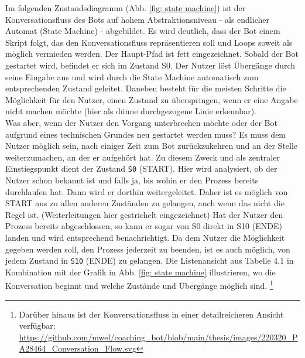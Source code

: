 	Im folgenden Zustandsdiagramm (Abb. \ref*{fig: state machine}) ist der Konversationsfluss des Bots auf hohem Abstraktionsniveau - als endlicher Automat (State Machine) - abgebildet. Es wird deutlich, dass der Bot einem Skript folgt, das den Konversationsfluss repräsentieren soll und Loops soweit als möglich vermieden werden. Der Haupt-Pfad ist fett eingezeichnet. Sobald der Bot gestartet wird, befindet er sich im Zustand S0. Der Nutzer löst Übergänge durch seine Eingabe aus und wird durch die State Machine automatisch zum entsprechenden Zustand geleitet. Daneben besteht für die meisten Schritte die Möglichkeit für den Nutzer, einen Zustand zu überspringen, wenn er eine Angabe nicht machen möchte (hier als dünne durchgezogene Linie erkennbar). \\
	Was aber, wenn der Nutzer den Vorgang unterbrechen möchte oder der Bot aufgrund eines technischen Grundes neu gestartet werden muss? Es muss dem Nutzer möglich sein, nach einiger Zeit zum Bot zurückzukehren und an der Stelle weiterzumachen, an der er aufgehört hat. Zu diesem Zweck und als zentraler Einstiegspunkt dient der Zustand \verb|S0| (START). Hier wird analysiert, ob der Nutzer schon bekannt ist und falls ja, bis wohin er den Prozess bereits durchlaufen hat. Dann wird er dorthin weitergeleitet. Daher ist es möglich von START aus zu allen anderen Zuständen zu gelangen, auch wenn das nicht die Regel ist. (Weiterleitungen hier gestrichelt eingezeichnet) Hat der Nutzer den Prozess bereits abgeschlossen, so kann er sogar von S0 direkt in S10 (ENDE) landen und wird entsprechend benachrichtigt. Da dem Nutzer die Möglichkeit gegeben werden soll, den Prozess jederzeit zu beenden, ist es auch möglich, von jedem Zustand in \verb|S10| (ENDE) zu gelangen. Die Listenansicht aus Tabelle 4.1 in Kombination mit der Grafik in Abb. \ref*{fig: state machine} illustrieren, wo die Konversation beginnt und welche Zustände und Übergänge möglich sind. \footnote{Darüber hinaus ist der Konversationsfluss in einer detailreicheren Ansicht verfügbar: \url{https://github.com/mwel/coaching_bot/blob/main/thesis/images/220320_PA28464_Conversation_Flow.svg}}
	
